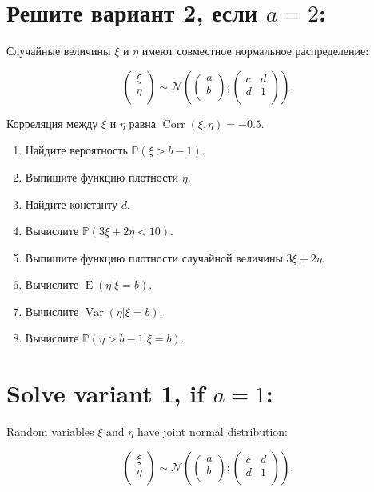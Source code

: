 \documentclass[12pt]{article}
\DeclareMathOperator{\Corr}{Corr}
\DeclareMathOperator{\Var}{Var}
\DeclareMathOperator{\E}{E}
\def \cN{\mathcal{N}}
\def \P{\mathbb{P}}
\begin{document}
\section*{Решите вариант 2, если $a=2$:}

Случайные величины $\xi$ и $\eta$ имеют совместное нормальное распределение:

\[
\begin{pmatrix}
  \xi \\
  \eta \\
\end{pmatrix}   \sim 
\cN \left(
\begin{pmatrix}
a \\
b \\
\end{pmatrix};
\begin{pmatrix}
  c & d \\
  d & 1 \\
\end{pmatrix}
\right).
\]

Корреляция между $\xi$ и $\eta$ равна $\Corr(\xi, \eta)= -0.5$.


\begin{enumerate}
\item Найдите вероятность $\P(\xi > b - 1)$.
\item Выпишите функцию плотности $\eta$.
\item Найдите константу $d$. 
\item Вычислите $\P(3\xi +2 \eta <10)$.
\item Выпишите функцию плотности случайной величины $3\xi +2\eta$.
\item Вычислите $\E(\eta |\xi = b)$.
\item Вычислите $\Var(\eta |\xi = b)$.
\item Вычислите $\P(\eta > b- 1 |\xi = b)$.
\end{enumerate}


\newpage

\section*{Solve variant 1, if $a=1$:}

Random variables $\xi$ and $\eta$ have joint normal distribution:

\[
\begin{pmatrix}
  \xi \\
  \eta \\
\end{pmatrix}   \sim 
\cN \left(
\begin{pmatrix}
a \\
b \\
\end{pmatrix};
\begin{pmatrix}
  c & d \\
  d & 1 \\
\end{pmatrix}
\right).
\]
\end{document}
